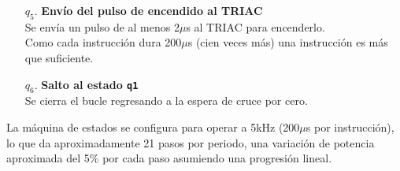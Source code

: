 \begin{enumerate}
	\item[\(q_5\).]  \textbf{Envío del pulso de encendido al TRIAC}\\
	Se envía un pulso de al menos 2\(\mu{}\)s al TRIAC para encenderlo.\\
	Como cada instrucción dura 200\(\mu{}\)s (cien veces más) una instrucción es más que suficiente.

\clearpage
	\item[\(q_6\).]  \textbf{Salto al estado \texttt{q1}}\\
	Se cierra el bucle regresando a la espera de cruce por cero.
\end{enumerate}

La máquina de estados se configura para operar a 5kHz (200\(\mu{}\)s por instrucción), lo que da aproximadamente 21 pasos por periodo, una variación de potencia aproximada del 5\% por cada paso asumiendo una progresión lineal.
